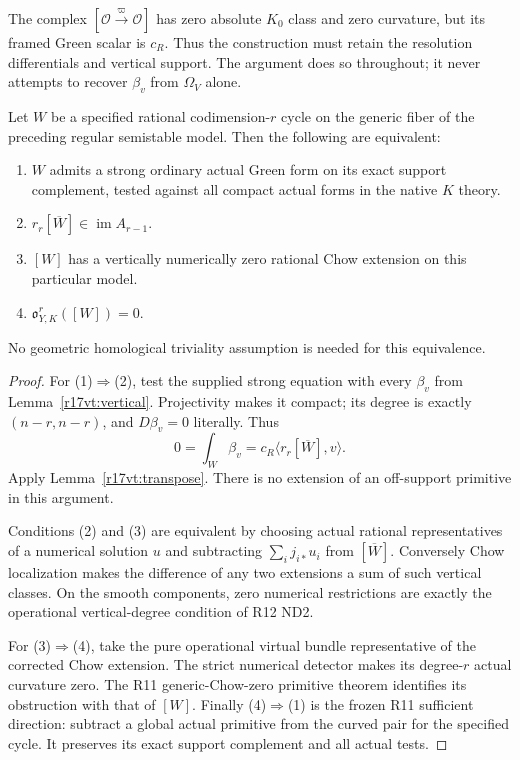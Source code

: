 \begin{remark}
The complex $[\mathcal O\xrightarrow{\varpi}\mathcal O]$
has zero absolute $K_0$ class and zero curvature, but its
framed Green scalar is $c_R$. Thus the construction must
retain the resolution differentials and vertical support.
The argument does so throughout; it never attempts to
recover $\beta_v$ from $\Omega_V$ alone.
\end{remark}

\begin{proposition}
\label{r17vt:model-converse}
Let $W$ be a specified rational codimension-$r$ cycle on
the generic fiber of the preceding regular semistable model.
Then the following are equivalent:
\begin{enumerate}
\item $W$ admits a strong ordinary actual Green form on its
      exact support complement, tested against all compact
      actual forms in the native $K$ theory.
\item $r_r[\overline W]\in\operatorname{im}A_{r-1}$.
\item $[W]$ has a vertically numerically zero rational Chow
      extension on this particular model.
\item $\mathfrak o_{Y,K}^r([W])=0$.
\end{enumerate}
No geometric homological triviality assumption is needed
for this equivalence.
\end{proposition}

\begin{proof}
For (1)$\Rightarrow$(2), test the supplied strong equation
with every $\beta_v$ from Lemma~\ref{r17vt:vertical}.
Projectivity makes it compact; its degree is exactly
$(n-r,n-r)$, and $D\beta_v=0$ literally. Thus
\[
                    0=\int_W\beta_v
                     =c_R\langle r_r[\overline W],v\rangle.
\]
Apply Lemma~\ref{r17vt:transpose}. There is no extension
of an off-support primitive in this argument.

Conditions (2) and (3) are equivalent by choosing actual
rational representatives of a numerical solution $u$ and
subtracting $\sum_i j_{i*}u_i$ from $[\overline W]$.
Conversely Chow localization makes the difference of any
two extensions a sum of such vertical classes. On the
smooth components, zero numerical restrictions are exactly
the operational vertical-degree condition of R12 ND2.

For (3)$\Rightarrow$(4), take the pure operational virtual
bundle representative of the corrected Chow extension.
The strict numerical detector makes its degree-$r$ actual
curvature zero. The R11 generic-Chow-zero primitive theorem
identifies its obstruction with that of $[W]$.
Finally (4)$\Rightarrow$(1) is the frozen R11 sufficient
direction: subtract a global actual primitive from the
curved pair for the specified cycle. It preserves its exact
support complement and all actual tests.
\end{proof}

